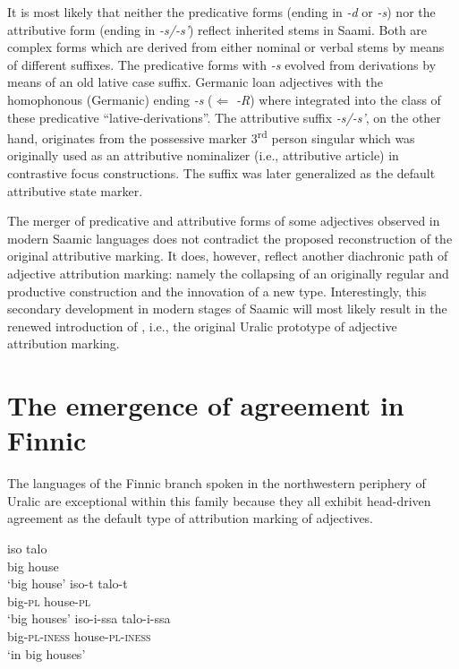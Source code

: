 {
It is most likely that neither the predicative forms (ending in \textit{-d} or \textit{-s}) nor the attributive form (ending in \textit{-s/-s'}) reflect inherited stems in Saami. Both are complex forms which are derived from either nominal or verbal stems by means of different suffixes. The predicative forms with \textit{-s} evolved from derivations by means of an old lative case suffix. Germanic loan adjectives with the homophonous (Germanic) ending \textit{-s} ($\Leftarrow$  \textit{-R}) where integrated into the class of these predicative “lative-derivations”. The attributive suffix \textit{-s/-s'}, on the other hand, originates from the possessive marker 3\textsuperscript{rd} person singular which was originally used as an attributive nominalizer (i.e., attributive article) in contrastive focus constructions. The suffix was later generalized as the default attributive state marker.


\largerpage
The merger of predicative and attributive forms of some adjectives observed in modern Saamic languages does not contradict the proposed reconstruction of the original attributive marking. It does, however, reflect another diachronic path of adjective attribution marking: namely the collapsing of an originally regular and productive construction and the innovation of a new type. Interestingly, this secondary development in modern stages of Saamic will most likely result in the renewed introduction of , i.e., the original Uralic prototype of adjective attribution marking.

\section[Agreement in Finnic]{The emergence of agreement in Finnic}
\label{Finnic diachr}
The languages of the Finnic branch spoken in the northwestern periphery of Uralic are exceptional within this family because they all exhibit head\hyp{}driven agreement as the default type of attribution marking of adjectives.
\begin{exe}
\begin{xlist}
\ex
\gll	iso talo\\
	big house\\
\glt	‘big house’
\ex	
\gll	iso-t talo-t\\
	big-\textsc{pl} house-\textsc{pl}\\
\glt	‘big houses’
\ex	
\gll	iso-i-ssa	talo-i-ssa\\
	big-\textsc{pl}-\textsc{iness} house-\textsc{pl}-\textsc{iness}\\
\glt	‘in big houses’
\end{xlist}
\end{exe}

}
